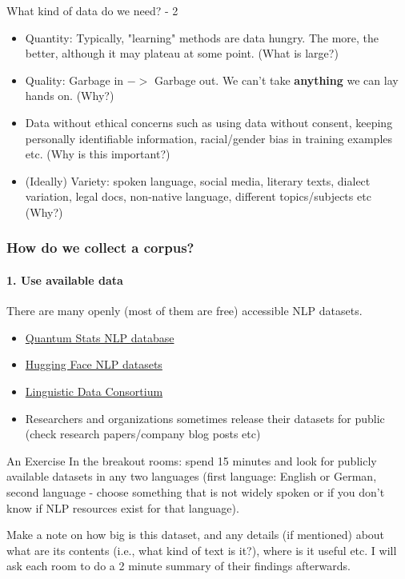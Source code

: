 \documentclass{beamer}
\begin{document}
\begin{frame}{What kind of data do we need? - 2}
\begin{itemize}
    \item Quantity: Typically, "learning" methods are data hungry. The more, the better, although it may plateau at some point. (What is large?) \pause
    \item Quality: Garbage in $->$ Garbage out. We can't take \textbf{anything} we can lay hands on. (Why?) \pause
    \item Data without ethical concerns such as using data without consent, keeping personally identifiable information, racial/gender bias in training examples etc. (Why is this important?) \pause
    \item (Ideally) Variety: spoken language, social media, literary texts, dialect variation, legal docs, non-native language, different topics/subjects etc (Why?) 
\end{itemize}
\end{frame}

\begin{frame}
\frametitle{How do we collect a corpus?}
\framesubtitle{1. Use available data}
There are many openly (most of them are free) accessible NLP datasets. 
\begin{itemize}
    \item \href{https://datasets.quantumstat.com/}{Quantum Stats NLP database}
    \item \href{https://huggingface.co/datasets}{Hugging Face NLP datasets}
    \item \href{https://www.ldc.upenn.edu/}{Linguistic Data Consortium}
    \item Researchers and organizations sometimes release their datasets for public (check research papers/company blog posts etc)
\end{itemize}
\end{frame}

\begin{frame}{An Exercise}
In the breakout rooms: spend 15 minutes and look for publicly available datasets in any two languages (first language: English or German, second language - choose something that is not widely spoken or if you don't know if NLP resources exist for that language).

Make a note on how big is this dataset, and any details (if mentioned) about what are its contents (i.e., what kind of text is it?), where is it useful etc. I will ask each room to do a 2 minute summary of their findings afterwards. 
\end{frame}
\end{document}
